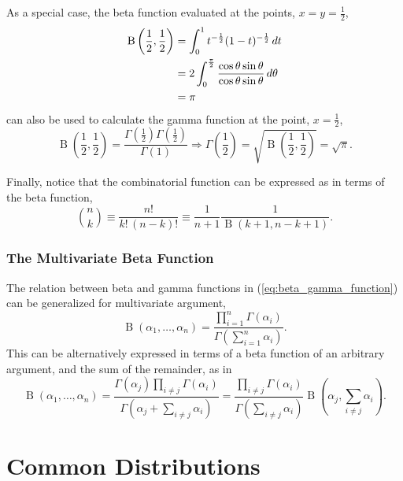 \documentclass[12pt, twoside, draft]{article}
\begin{document}
As a special case, the beta function evaluated at the points, $x = y = \frac{1}{2}$, 
\begin{align}
\operatorname{B}\left( \frac{1}{2}, \frac{1}{2} \right) &= \int_0^1t^{-\frac{1}{2}} (1-t)^{-\frac{1}{2}} \,dt \notag \\
&= 2\int_0^{\frac{\pi}{2}} \frac{\cos \theta \sin \theta}{\cos \theta \sin \theta} \,d\theta \notag \\
&= \pi
\end{align}
can also be used to calculate the gamma function at the point, $x = \frac{1}{2}$,
\begin{equation}
\operatorname{B}\left( \frac{1}{2},\frac{1}{2} \right) = \frac{\Gamma(\frac{1}{2}) \Gamma(\frac{1}{2})}{\Gamma(1)} \Rightarrow \Gamma \left( \frac{1}{2} \right) = \sqrt{\operatorname{B}\left(\frac{1}{2}, \frac{1}{2} \right)} = \sqrt{\pi}.
\end{equation}

Finally, notice that the combinatorial function can be expressed as in terms of the beta function,
\begin{equation}\label{eq:combinatorial_beta_relation}
\binom{n}{k} \equiv \frac{n!}{k! \, (n-k)!} \equiv \frac{1}{n+1}\frac{1}{\operatorname{B}(k+1, n-k+1)}.
\end{equation}

\subsubsection {The Multivariate Beta Function}
The relation between beta and gamma functions in (\ref{eq:beta_gamma_function}) can be generalized for multivariate argument,
\begin{equation}\label{eq:multivariate_beta_function}
\operatorname{B}(\alpha_1, \ldots, \alpha_n) = \frac{\prod_{i=1}^n \Gamma(\alpha_i)}{\Gamma \left( \sum_{i=1}^n \alpha_i \right)}.
\end{equation}
This can be alternatively expressed in terms of a beta function of an arbitrary argument, and the sum of the remainder, as in
\begin{equation}
\operatorname{B}(\alpha_1, \ldots, \alpha_n) = \frac{\Gamma(\alpha_j) \prod_{i \neq j} \Gamma(\alpha_i)}{\Gamma \left( \alpha_j + \sum_{i \neq j} \alpha_i \right)} = \frac{\prod_{i \neq j} \Gamma(\alpha_i)}{\Gamma (\sum_{i \neq j} \alpha_i)} \operatorname{B} \left(\alpha_j, \sum_{i \neq j} \alpha_i \right).
\end{equation}

\section{Common Distributions}\label{sec:common_distributions}
\end{document}
